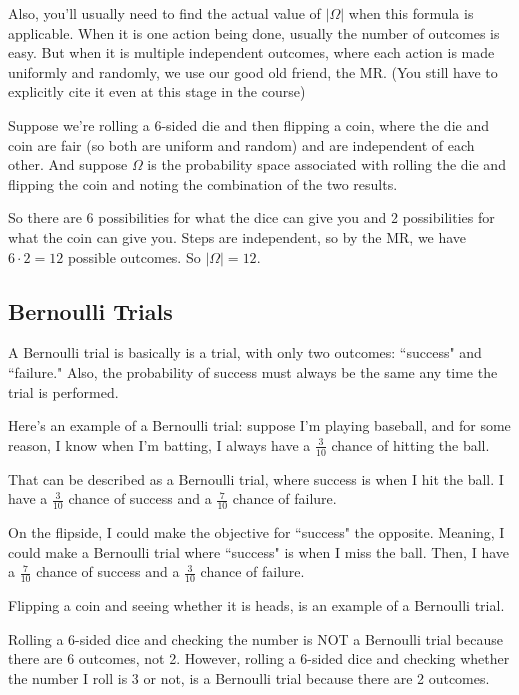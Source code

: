 \documentclass[11pt]{scrartcl}
\begin{document}
Also, you'll usually need to find the actual value of $|\Omega|$ when this formula is applicable. When it is one action being done, usually the number of outcomes is easy. But when it is multiple independent outcomes, where each action is made uniformly and randomly, we use our good old friend, the MR. (You still have to explicitly cite it even at this stage in the course)

Suppose we're rolling a 6-sided die and then flipping a coin, where the die and coin are fair (so both are uniform and random) and are independent of each other. And suppose $\Omega$ is the probability space associated with rolling the die and flipping the coin and noting the combination of the two results.

So there are 6 possibilities for what the dice can give you and 2 possibilities for what the coin can give you. Steps are independent, so by the MR, we have $6 \cdot 2 = 12$ possible outcomes. So $|\Omega| = 12$.

\subsection{Bernoulli Trials}

\begin{definition}
    A Bernoulli trial is basically is a trial, with only two outcomes: ``success" and ``failure." Also, the probability of success must always be the same any time the trial is performed.
\end{definition}

Here's an example of a Bernoulli trial: suppose I'm playing baseball, and for some reason, I know when I'm batting, I always have a $\frac{3}{10}$ chance of hitting the ball.

That can be described as a Bernoulli trial, where success is when I hit the ball. I have a $\frac{3}{10}$ chance of success and a $\frac{7}{10}$ chance of failure.

On the flipside, I could make the objective for ``success" the opposite. Meaning, I could make a Bernoulli trial where ``success" is when I miss the ball. Then,  I have a $\frac{7}{10}$ chance of success and a $\frac{3}{10}$ chance of failure.

Flipping a coin and seeing whether it is heads, is an example of a Bernoulli trial.

Rolling a 6-sided dice and checking the number is NOT a Bernoulli trial because there are 6 outcomes, not 2. However, rolling a 6-sided dice and checking whether the number I roll is 3 or not, is a Bernoulli trial because there are 2 outcomes.
\end{document}
